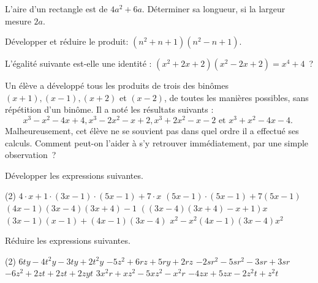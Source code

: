 \documentclass[a4paper,12pt]{report}
\begin{document}
\begin{exo}
L'aire d'un rectangle est de $4 a^2+6 a$. Déterminer sa longueur, si la largeur mesure $2 a$.
\end{exo}
\begin{exo}
Développer et réduire le produit: $\left(n^2+n+1\right)\left(n^2-n+1\right)$. 
\begin{comment}
$\left(^*\right)$ Déterminer toutes les valeurs de l'entier naturel $n$, pour lesquelles $n^4+n^2+1$ est un nombre premier.
\end{comment}
\end{exo}
\begin{exo}
L'égalité suivante est-elle une identité : $\left(x^2+2 x+2\right)\left(x^2-2 x+2\right)=x^4+4$~?
\end{exo}
\begin{exo}
Un élève a développé tous les produits de trois des binômes $(x+1),(x-1),(x+2)$ et $(x-2)$, de toutes les manières possibles, sans répétition d'un binôme. Il a noté les résultats suivants :
$$
x^3-x^2-4 x+4, x^3-2 x^2-x+2, x^3+2 x^2-x-2 \text { et } x^3+x^2-4 x-4 \text {. }
$$
Malheureusement, cet élève ne se souvient pas dans quel ordre il a effectué ses calculs.
Comment peut-on l'aider à s'y retrouver immédiatement, par une simple observation~?
\end{exo}
\begin{exo}
	Développer les expressions suivantes. 
\begin{tasks}(2)
	\task $4 \cdot x+1 \cdot(3 x-1) \cdot(5 x-1)+7 \cdot x$
\task $(5 x-1) \cdot(5 x-1)+7(5 x-1)$
\task $(4 x-1)(3 x-4)(3 x+4)-1$
\task $((3 x-4)(3 x+4)-x+1) x$
\task $(3 x-1)(x-1)+(4 x-1)(3 x-4)$
\task $x^2-x^2(4x-1)(3x-4)x^2$
\end{tasks}
\end{exo}

\begin{auto}Réduire les expressions suivantes.

\begin{tasks}(2)
	\task $6 t y-4 t^2 y-3 t y + 2 t^2 y$
	\task $-5 z^2 + 6 r z + 5 r y + 2 r z$
	\task $-2 s r^2-5 s r^2-3 s r + 3 s r$
	\task $-6 z^2 + 2 z t + 2 z t + 2 z y t$
	\task $3 x^2 r + x z^2-5 x z^2-x^2 r$
	\task $-4 z x + 5 z x-2 z^2 t + z^2 t$
\end{tasks}
\end{auto}
\end{document}
